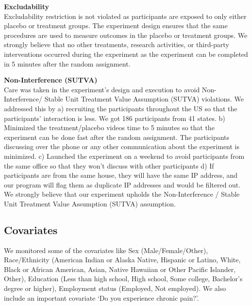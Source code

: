 \documentclass[
]{article}
\begin{document}
\textbf{Excludability}\\
Excludability restriction is not violated as participants are exposed to
only either placebo or treatment groups. The experiment design ensures
that the same procedures are used to measure outcomes in the placebo or
treatment groups. We strongly believe that no other treatments, research
activities, or third-party interventions occurred during the experiment
as the experiment can be completed in 5 minutes after the random
assignment.

\textbf{Non-Interference (SUTVA)}\\
Care was taken in the experiment's design and execution to avoid
Non-Interference/ Stable Unit Treatment Value Assumption (SUTVA)
violations. We addressed this by a) recruiting the participants
throughout the US so that the participants' interaction is less. We got
186 participants from 41 states. b) Minimized the treatment/placebo
videos time to 5 minutes so that the experiment can be done fast after
the random assignment. The participants discussing over the phone or any
other communication about the experiment is minimized. c) Launched the
experiment on a weekend to avoid participants from the same office so
that they won't discuss with other participants d) If participants are
from the same house, they will have the same IP address, and our program
will flag them as duplicate IP addresses and would be filtered out. We
strongly believe that our experiment upholds the Non-Interference /
Stable Unit Treatment Value Assumption (SUTVA) assumption.

\hypertarget{covariates}{%
\subsection{Covariates}\label{covariates}}

We monitored some of the covariates like Sex (Male/Female/Other),
Race/Ethnicity (American Indian or Alaska Native, Hispanic or Latino,
White, Black or African American, Asian, Native Hawaiian or Other
Pacific Islander, Other), Education (Less than high school, High school,
Some college, Bachelor's degree or higher), Employment status (Employed,
Not employed). We also include an important covariate `Do you experience
chronic pain?'.
\end{document}
